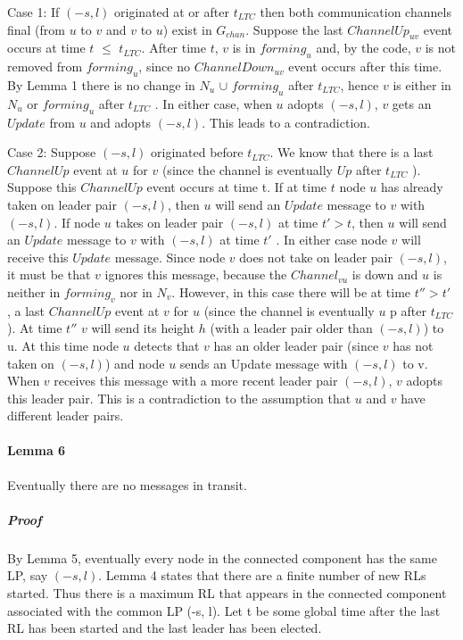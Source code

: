 Case 1: If $(-s, l)$ originated at or after $t_{LTC}$ then both communication channels final (from $u$ to $v$ and $v$ to $u$) exist in $G_{chan}$. Suppose the last $ChannelUp_{uv}$ event occurs at time $t$ $\leq$ $t_{LTC}$. After time $t$, $v$ is in $forming_u$ and, by the code, $v$ is not removed from $forming_u$, since no $ChannelDown_{uv}$ event occurs after this time. By Lemma 1 there is no change in $N_u$ $\cup$ $forming_u$ after $t_{LTC}$, hence $v$ is either in $N_u$ or $forming_u$ after $t_{LTC}$ . In either case, when $u$ adopts $(-s, l)$, $v$ gets an $Update$ from $u$ and adopts $(-s, l)$. This leads to a contradiction.

Case 2: Suppose $(-s, l)$ originated before $t_{LTC}$. We know that there is a last $ChannelUp$ event at $u$ for $v$ (since the channel is eventually $Up$ after $t_{LTC}$ ). Suppose this $ChannelUp$ event occurs at time t. If at time $t$ node $u$ has already taken on leader pair $(-s, l)$, then $u$ will send an $Update$ message to $v$ with $(-s, l)$. If node $u$ takes on leader pair $(-s, l)$ at time $t'> t$, then $u$ will send an $Update$ message to $v$ with $(-s, l)$ at time $t'$ . In either case node $v$ will receive this $Update$ message. Since node $v$ does not take on leader pair $(-s, l)$, it must be that $v$ ignores this message, because the $Channel_{vu}$ is down and $u$ is neither in $forming_v$ nor in $N_v$. However, in this case there will be at time $t'' > t '$ , a last $ChannelUp$ event at $v$ for $u$ (since the channel is eventually $u$ p after $t_{LTC}$ ). At time $t''$ $v$ will send its height $h$ (with a leader pair older than $(-s, l)$) to u. At this time node $u$ detects that $v$ has an older leader pair (since $v$ has not taken on $(-s, l)$) and node $u$ sends an Update message with $(-s, l)$ to v. When $v$ receives this message with a more recent leader pair $(-s, l)$, $v$ adopts this leader pair. This is a contradiction to the assumption that $u$ and $v$ have different leader pairs.
\paragraph{Lemma 6}Eventually there are no messages in transit.
\subparagraph{Proof}By Lemma 5, eventually every node in the connected component has the same LP, say $(-s, l)$. Lemma 4 states that there are a finite number of new RLs started. Thus there is a maximum RL that appears in the connected component associated with the common LP (-s, l). Let t be some global time after the last RL has been started and the last leader has been elected.


